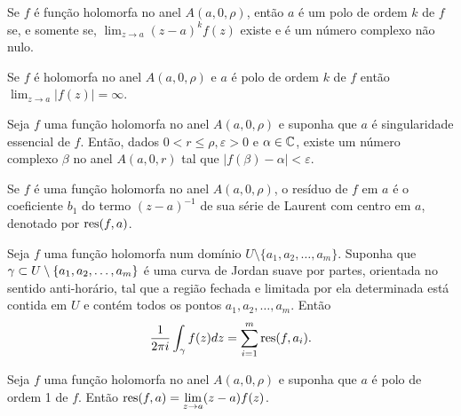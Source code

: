 \begin{proposicao}
Se $f$ é função holomorfa no anel $A(a, 0, \rho)$, então $a$ é um polo de ordem $k$ de $f$
se, e somente se, $\displaystyle{ \lim_{z\to a} (z-a)^k f(z) }$ existe e é um número complexo não nulo.
\end{proposicao}

\clearpage
\begin{corolario}
Se $f$ é holomorfa no anel $A(a, 0, \rho)$ e $a$ é polo de ordem $k$ de $f$ então
$\displaystyle{ \lim_{z\to a} |f(z)| = \infty }$.
\end{corolario}


\begin{teorema}
\label{teo-casorati-weierstrass}
Seja $f$ uma função holomorfa no anel $A(a,0,\rho)$ e suponha que $a$ é singularidade essencial de $f$.
Então, dados $0<r\leq\rho, \varepsilon > 0$ e $\alpha\in\mathbb{C}$, existe um número complexo $\beta$
no anel $A(a,0,r)$ tal que $|f(\beta) - \alpha| < \varepsilon$.
\end{teorema}


\begin{definicao}[Resíduo]
\label{def-residuo}
Se $f$ é uma função holomorfa no anel $A(a, 0, \rho)$, o resíduo de $f$ em $a$ é o coeficiente $b_1$
do termo $(z-a)^{-1}$ de sua série de Laurent com centro em $a$, denotado por $\operatorname{res}(f, a)$.
\end{definicao}


\begin{teorema}
\label{teo-residuos}
Seja $f$ uma função holomorfa num domínio $U\setminus\{ a_1, a_2, \dots, a_m \}$. Suponha que 
$\gamma \subset U\setminus\{ a_1, a_2, \dots, a_m \}$ é uma curva de Jordan suave por partes,
orientada no sentido anti-horário, tal que a região fechada e limitada por ela determinada está
contida em $U$ e contém todos os pontos $ a_1, a_2, \dots, a_m$. Então
\begin{equation*}
    \frac{1}{2\pi i}\int_{\gamma} f(z) dz = \sum_{i=1}^m \operatorname{res}(f, a_i).
\end{equation*}
\end{teorema}


\begin{proposicao}
Seja $f$ uma função holomorfa no anel $A(a, 0, \rho)$ e suponha que $a$ é polo de ordem 1 de $f$.
Então $\operatorname{res}(f,a) = \displaystyle{ \lim_{z\to a} (z-a) f(z) }$.
\end{proposicao}


